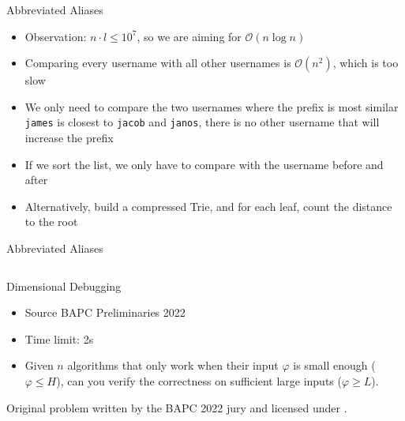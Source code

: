 \documentclass[11pt,pdf, aspectratio=169]{beamer}
\begin{document}
  \begin{frame}{Abbreviated Aliases}
    \begin{itemize}
      \item<+-> Observation: $n\cdot l \leq 10^7$, so we are aiming for $\mathcal{O}(n\log{}n)$
      \item<+-> Comparing every username with all other usernames is $\mathcal{O}(n^2)$, which is too slow
      \item<+-> We only need to compare the two usernames where the prefix is most similar\\
      \texttt{james} is closest to \texttt{jacob} and \texttt{janos}, there is no other username that will increase the prefix
      \item<+-> If we sort the list, we only have to compare with the username before and after
      \item<+-> Alternatively, build a compressed Trie, and for each leaf, count the distance to the root
    \end{itemize}
  \end{frame}
  \begin{frame}[containsverbatim]{Abbreviated Aliases}
    \inputminted{python}{code/session-1/python/dapc-a.py}
  \end{frame}

  \begin{frame}{Dimensional Debugging}
    \begin{itemize}
      \item Source BAPC Preliminaries 2022
      \item Time limit: 2s
      \item Given $n$ algorithms that only work when their input $\varphi$ is small enough ($\varphi \leq H$), can you verify the correctness on sufficient large inputs ($\varphi \geq L$).
    \end{itemize}
    Original problem written by the BAPC 2022 jury and licensed under \doclicenseLongNameRef.

    \doclicenseImage
  \end{frame}
\end{document}
